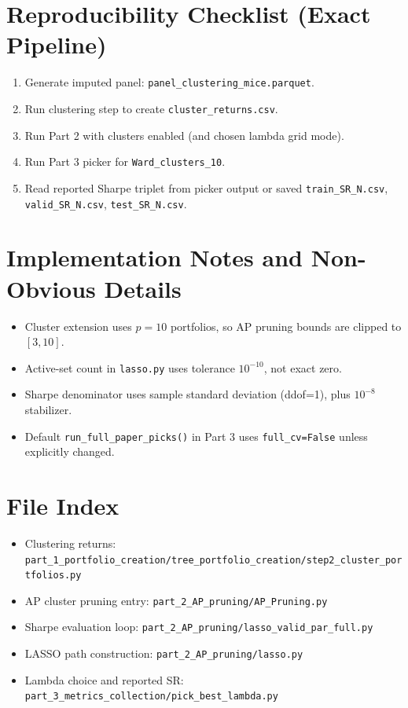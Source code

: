 ﻿\documentclass[11pt]{article}
\begin{document}
\section{Reproducibility Checklist (Exact Pipeline)}
\begin{enumerate}[label=\textbf{R\arabic*.}]
  \item Generate imputed panel: \texttt{panel\_clustering\_mice.parquet}.
  \item Run clustering step to create \texttt{cluster\_returns.csv}.
  \item Run Part 2 with clusters enabled (and chosen lambda grid mode).
  \item Run Part 3 picker for \texttt{Ward\_clusters\_10}.
  \item Read reported Sharpe triplet from picker output or saved \texttt{train\_SR\_N.csv},
  \texttt{valid\_SR\_N.csv}, \texttt{test\_SR\_N.csv}.
\end{enumerate}

\section{Implementation Notes and Non-Obvious Details}
\begin{itemize}
  \item Cluster extension uses $p=10$ portfolios, so AP pruning bounds are clipped to $[3,10]$.
  \item Active-set count in \texttt{lasso.py} uses tolerance $10^{-10}$, not exact zero.
  \item Sharpe denominator uses sample standard deviation (ddof=1), plus $10^{-8}$ stabilizer.
  \item Default \texttt{run\_full\_paper\_picks()} in Part 3 uses \texttt{full\_cv=False} unless explicitly changed.
\end{itemize}

\section*{File Index}
\begin{itemize}
  \item Clustering returns: \texttt{part\_1\_portfolio\_creation/tree\_portfolio\_creation/step2\_cluster\_portfolios.py}
  \item AP cluster pruning entry: \texttt{part\_2\_AP\_pruning/AP\_Pruning.py}
  \item Sharpe evaluation loop: \texttt{part\_2\_AP\_pruning/lasso\_valid\_par\_full.py}
  \item LASSO path construction: \texttt{part\_2\_AP\_pruning/lasso.py}
  \item Lambda choice and reported SR: \texttt{part\_3\_metrics\_collection/pick\_best\_lambda.py}
\end{itemize}
\end{document}
